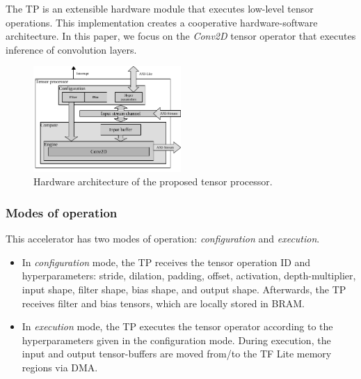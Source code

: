 The TP is an extensible hardware module that executes low-level tensor operations. This implementation creates a cooperative hardware-software architecture. In this paper, we focus on the \emph{Conv2D} tensor operator that executes inference of convolution layers.

\begin{figure}[t!]
	\centering
	\includegraphics[width=0.5\textwidth]{../figures/accelerator.pdf}
	\caption{Hardware architecture of the proposed tensor processor.}
	\label{fig:accelerator}
\end{figure}
\subsubsection{\textbf{Modes of operation}}
This accelerator has two modes of operation: \emph{configuration} and \emph{execution}.
\begin{itemize}
	\item In \emph{configuration} mode, the TP receives the tensor operation ID and hyperparameters: stride, dilation, padding, offset, activation, depth-multiplier, input shape, filter shape, bias shape, and output shape. Afterwards, the TP receives filter and bias tensors, which are locally stored in BRAM.
	
	\item In \emph{execution} mode, the TP executes the tensor operator according to the hyperparameters given in the configuration mode. During execution, the input and output tensor-buffers are moved from/to the TF Lite memory regions via DMA.
\end{itemize}
